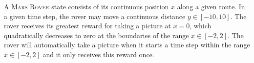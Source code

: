 \documentclass[twoside,11pt]{article}
\newcommand{\MarsRover}{\textsc{Mars Rover }}
\begin{document}

A \MarsRover state consists of its continuous position $x$ along a given route.  In a given time step, the rover may move a continuous distance $y \in [-10,10]$.  The rover receives its greatest reward for taking a picture at $x=0$, which quadratically decreases to zero at the boundaries of the range $x \in [-2,2]$.  The rover will
automatically take a picture when it starts a time step within the range $x \in [-2,2]$ and it only receives this reward once.
\end{document}
